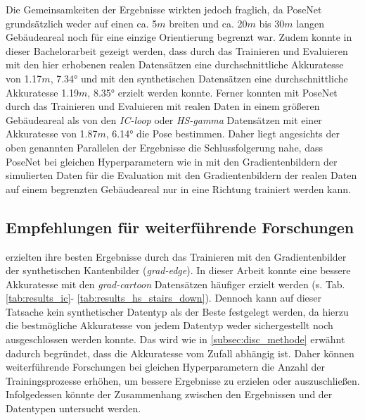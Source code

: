 Die Gemeinsamkeiten der Ergebnisse wirkten jedoch fraglich, da PoseNet grundsätzlich weder auf einen ca. 5$m$ breiten und ca. 20$m$ bis 30$m$ langen Gebäudeareal noch für eine einzige Orientierung begrenzt war. Zudem konnte in dieser Bachelorarbeit gezeigt werden, dass durch das Trainieren und Evaluieren mit den hier erhobenen realen Datensätzen eine durchschnittliche Akkuratesse von 1.17$m$, 7.34° und mit den synthetischen Datensätzen eine durchschnittliche Akkuratesse 1.19$m$, 8.35° erzielt werden konnte. Ferner konnten \citet{walchImageBasedLocalizationUsing2017} mit PoseNet durch das Trainieren und Evaluieren mit realen Daten in einem größeren Gebäudeareal als von den \textit{IC-loop} oder \textit{HS-gamma} Datensätzen mit einer Akkuratesse von 1.87$m$, 6.14° die Pose bestimmen. Daher liegt angesichts der oben genannten Parallelen der Ergebnisse die Schlussfolgerung nahe, dass PoseNet bei gleichen Hyperparametern wie in \cite{acharyaBIMPoseNetIndoorCamera2019} mit den Gradientenbildern der simulierten Daten für die Evaluation mit den Gradientenbildern der realen Daten auf einem begrenzten Gebäudeareal nur in eine Richtung trainiert werden kann.


\subsection{Empfehlungen für weiterführende Forschungen}

\citet{acharyaBIMPoseNetIndoorCamera2019} erzielten ihre besten Ergebnisse durch das Trainieren mit den Gradientenbilder der synthetischen Kantenbilder (\textit{grad-edge}). In dieser Arbeit konnte eine bessere Akkuratesse mit den \textit{grad-cartoon} Datensätzen häufiger erzielt werden (s. Tab. \ref{tab:results_ic}- \ref{tab:results_hs_stairs_down}). Dennoch kann auf dieser Tatsache kein synthetischer Datentyp als der Beste festgelegt werden, da hierzu die bestmögliche Akkuratesse von jedem Datentyp weder sichergestellt noch ausgeschlossen werden konnte. Das wird wie in \ref{subsec:disc_methode} erwähnt dadurch begründet, dass die Akkuratesse vom Zufall abhängig ist. Daher können weiterführende Forschungen bei gleichen Hyperparametern die Anzahl der Trainingsprozesse erhöhen, um bessere Ergebnisse zu erzielen oder auszuschließen. Infolgedessen könnte der Zusammenhang zwischen den Ergebnissen und der Datentypen untersucht werden. 

